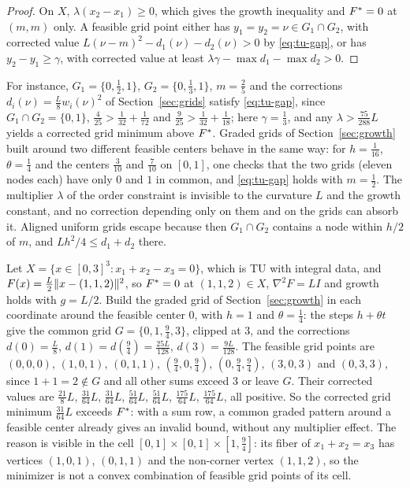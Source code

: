 \begin{proof}
On $X$, $\lambda(x_2-x_1)\ge0$, which gives the growth inequality and
$F^*=0$ at $(m,m)$ only. A feasible grid point either has $y_1=y_2=\nu\in
G_1\cap G_2$, with corrected value $L(\nu-m)^2-d_1(\nu)-d_2(\nu)>0$ by
\eqref{eq:tu-gap}, or has $y_2-y_1\ge\gamma$, with corrected value at least
$\lambda\gamma-\max d_1-\max d_2>0$.
\end{proof}

For instance, $G_1=\{0,\frac12,1\}$, $G_2=\{0,\frac13,1\}$, $m=\frac25$ and the
corrections $d_i(\nu)=\frac L8w_i(\nu)^2$ of Section~\ref{sec:grids} satisfy
\eqref{eq:tu-gap}, since $G_1\cap G_2=\{0,1\}$,
$\frac4{25}>\frac1{32}+\frac1{72}$ and $\frac9{25}>\frac1{32}+\frac1{18}$; here
$\gamma=\frac13$, and any $\lambda>\frac{75}{288}L$ yields a corrected grid minimum
above $F^*$. Graded grids of Section~\ref{sec:growth} built around two
different feasible centers behave in the same way: for $h=\frac1{16}$,
$\theta=\frac14$ and the centers $\frac3{10}$ and $\frac7{10}$ on $[0,1]$, one
checks that the two grids (eleven nodes each) have only $0$ and $1$ in common,
and \eqref{eq:tu-gap} holds with $m=\frac12$. The
multiplier $\lambda$ of the order constraint is invisible to the curvature
$L$ and the growth constant, and no correction depending only on them and on
the grids can absorb it. Aligned uniform grids escape because then
$G_1\cap G_2$ contains a node within $h/2$ of $m$, and
$Lh^2/4\le d_1+d_2$ there.

\begin{example}\label{ex:tu-sum}
Let $X=\{x\in[0,3]^3:x_1+x_2-x_3=0\}$, which is TU with integral data, and
$F(x)=\frac L2\lVert x-(1,1,2)\rVert^2$, so $F^*=0$ at $(1,1,2)\in X$,
$\nabla^2F=LI$ and growth holds with $g=L/2$. Build the graded grid of
Section~\ref{sec:growth} in each coordinate around the feasible center $0$,
with $h=1$ and $\theta=\frac14$: the steps $h+\theta t$ give the common grid
$G=\{0,1,\frac94,3\}$, clipped at $3$, and the corrections
$d(0)=\frac L8$, $d(1)=d(\frac94)=\frac{25L}{128}$, $d(3)=\frac{9L}{128}$. The feasible
grid points are
$(0,0,0)$, $(1,0,1)$, $(0,1,1)$, $(\frac94,0,\frac94)$, $(0,\frac94,\frac94)$,
$(3,0,3)$ and $(0,3,3)$, since $1+1=2\notin G$ and all other sums exceed $3$ or
leave $G$. Their corrected values are
$\frac{21}8L$, $\frac{31}{64}L$, $\frac{31}{64}L$, $\frac{51}{64}L$, $\frac{51}{64}L$,
$\frac{175}{64}L$, $\frac{175}{64}L$, all positive. So the corrected grid minimum
$\frac{31}{64}L$ exceeds $F^*$: with a sum row, a common graded pattern around a
feasible center already gives an invalid bound, without any multiplier
effect. The reason is visible in the cell $[0,1]\times[0,1]\times[1,\frac94]$:
its fiber of $x_1+x_2=x_3$ has vertices $(1,0,1)$, $(0,1,1)$ and the
non-corner vertex $(1,1,2)$, so the minimizer is not a convex combination of
feasible grid points of its cell.
\end{example}

